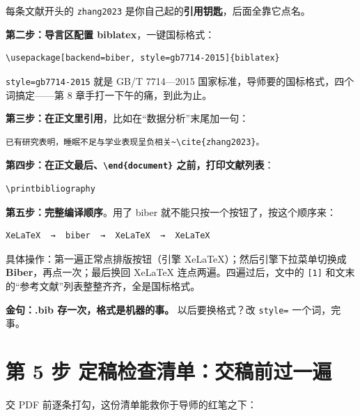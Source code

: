 每条文献开头的 \texttt{zhang2023} 是你自己起的\textbf{引用钥匙}，后面全靠它点名。

\textbf{第二步：导言区配置 biblatex}，一键国标格式：

\begin{lstlisting}
\usepackage[backend=biber, style=gb7714-2015]{biblatex}

\end{lstlisting}

\texttt{style=gb7714-2015} 就是 GB/T 7714—2015 国家标准，导师要的国标格式，四个词搞定——第 8 章手打一下午的痛，到此为止。

\textbf{第三步：在正文里引用}，比如在“数据分析”末尾加一句：

\begin{lstlisting}
已有研究表明，睡眠不足与学业表现呈负相关~\cite{zhang2023}。
\end{lstlisting}

\textbf{第四步：在正文最后、\texttt{\textbackslash{}end\{document\}} 之前，打印文献列表}：

\begin{lstlisting}
\printbibliography
\end{lstlisting}

\textbf{第五步：完整编译顺序}。用了 biber 就不能只按一个按钮了，按这个顺序来：

\begin{lstlisting}
XeLaTeX  →  biber  →  XeLaTeX  →  XeLaTeX
\end{lstlisting}

具体操作：第一遍正常点排版按钮（引擎 XeLaTeX）；然后引擎下拉菜单切换成 \textbf{Biber}，再点一次；最后换回 XeLaTeX 连点两遍。四遍过后，文中的 \texttt{[1]} 和文末的“参考文献”列表整整齐齐，全是国标格式。

\begin{notebox}
\textbf{金句：.bib 存一次，格式是机器的事。} 以后要换格式？改 \texttt{style=} 一个词，完事。
\end{notebox}

\section*{第 5 步 定稿检查清单：交稿前过一遍}

交 PDF 前逐条打勾，这份清单能救你于导师的红笔之下：

